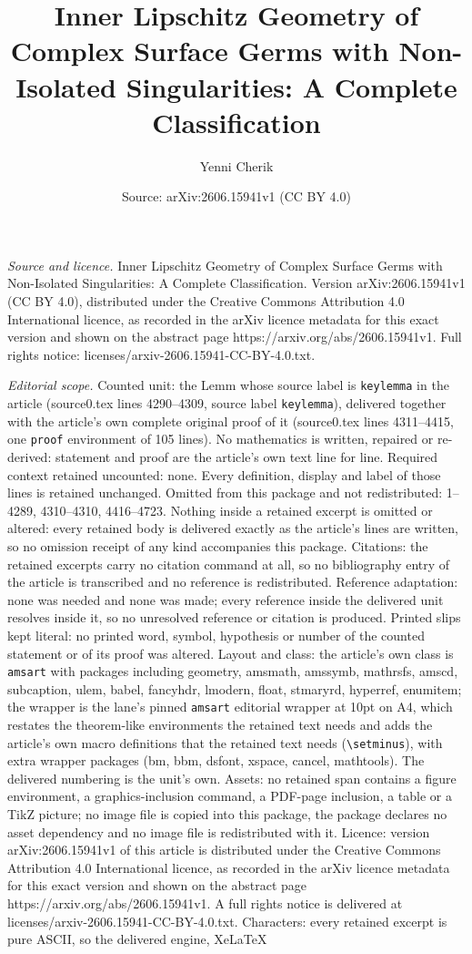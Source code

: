 \documentclass[10pt,a4paper]{amsart}
\title[Inner Lipschitz Geometry of Complex Surface Germs with Non-I]{Inner Lipschitz Geometry of Complex Surface Germs with Non-Isolated Singularities: A Complete Classification}
\author{Yenni Cherik}
\date{Source: arXiv:2606.15941v1 (CC BY 4.0)}
\begin{document}
\maketitle

\noindent\emph{Source and licence.} Inner Lipschitz Geometry of Complex Surface Germs with Non-Isolated Singularities: A Complete Classification. Version arXiv:2606.15941v1 (CC BY 4.0), distributed under the Creative Commons Attribution 4.0 International licence, as recorded in the arXiv licence metadata for this exact version and shown on the abstract page https://arxiv.org/abs/2606.15941v1. Full rights notice: licenses/arxiv-2606.15941-CC-BY-4.0.txt.\par\smallskip

\noindent\textit{Editorial scope.} Counted unit: the Lemm whose source label is \texttt{keylemma} in the article (source0.tex lines 4290--4309, source label \texttt{keylemma}), delivered together with the article's own complete original proof of it (source0.tex lines 4311--4415, one \texttt{proof} environment of 105 lines). No mathematics is written, repaired or re-derived: statement and proof are the article's own text line for line. Required context retained uncounted: none. Every definition, display and label of those lines is retained unchanged. Omitted from this package and not redistributed: 1--4289, 4310--4310, 4416--4723. Nothing inside a retained excerpt is omitted or altered: every retained body is delivered exactly as the article's lines are written, so no omission receipt of any kind accompanies this package. Citations: the retained excerpts carry no citation command at all, so no bibliography entry of the article is transcribed and no reference is redistributed. Reference adaptation: none was needed and none was made; every reference inside the delivered unit resolves inside it, so no unresolved reference or citation is produced. Printed slips kept literal: no printed word, symbol, hypothesis or number of the counted statement or of its proof was altered. Layout and class: the article's own class is \texttt{amsart} with packages including geometry, amsmath, amssymb, mathrsfs, amscd, subcaption, ulem, babel, fancyhdr, lmodern, float, stmaryrd, hyperref, enumitem; the wrapper is the lane's pinned \texttt{amsart} editorial wrapper at 10pt on A4, which restates the theorem-like environments the retained text needs and adds the article's own macro definitions that the retained text needs (\texttt{\textbackslash setminus}), with extra wrapper packages (bm, bbm, dsfont, xspace, cancel, mathtools). The delivered numbering is the unit's own. Assets: no retained span contains a figure environment, a graphics-inclusion command, a PDF-page inclusion, a table or a TikZ picture; no image file is copied into this package, the package declares no asset dependency and no image file is redistributed with it. Licence: version arXiv:2606.15941v1 of this article is distributed under the Creative Commons Attribution 4.0 International licence, as recorded in the arXiv licence metadata for this exact version and shown on the abstract page https://arxiv.org/abs/2606.15941v1. A full rights notice is delivered at licenses/arxiv-2606.15941-CC-BY-4.0.txt. Characters: every retained excerpt is pure ASCII, so the delivered engine, XeLaTeX 
\end{document}

